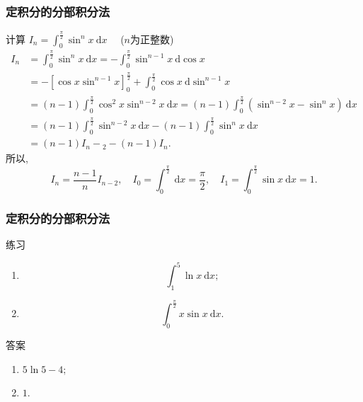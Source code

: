 \documentclass[
10pt,
aspectratio=43,
]{beamer}
\begin{document}
\begin{frame}
	\frametitle{定积分的分部积分法}
	\everymath{\displaystyle}
	{\small
		\begin{block}{计算 $I_n=\int_0^{\frac{\pi}{2}} \sin ^n x \mathrm{~d} x\quad$ ($n$为正整数) }
			$$
				\begin{aligned}
					I_n & =\int_0^{\frac{\pi}{2}} \sin ^n x \mathrm{~d} x=-\int_0^{\frac{\pi}{2}} \sin ^{n-1} x \mathrm{~d} \cos x                                           \\
					    & =-\left[\cos x \sin ^{n-1} x\right]_0^{\frac{\pi}{2}}+\int_0^{\frac{\pi}{2}} \cos x \mathrm{~d} \sin ^{n-1} x                                      \\
					    & =(n-1) \int_0^{\frac{\pi}{2}} \cos ^2 x \sin ^{n-2} x \mathrm{~d} x=(n-1) \int_0^{\frac{\pi}{2}}\left(\sin ^{n-2} x-\sin ^n x\right) \mathrm{~d} x \\
					    & =(n-1) \int_0^{\frac{\pi}{2}} \sin ^{n-2} x \mathrm{~d} x-(n-1) \int_0^{\frac{\pi}{2}} \sin ^n x \mathrm{~d} x                                     \\
					    & =(n-1) I_n-{ }_2-(n-1) I_n.
				\end{aligned}
			$$
			所以,
			$$
				I_n=\frac{n-1}{n} I_{n-2},\quad I_0=\int_0^{\frac{\pi}{2}} \mathrm{~d} x=\frac{\pi}{2}, \quad I_1=\int_0^{\frac{\pi}{2}} \sin x \mathrm{~d} x=1.
			$$
		\end{block}
	}
\end{frame}

\begin{frame}
	\frametitle{定积分的分部积分法}
	\everymath{\displaystyle}
	\begin{block}{练习}
		\begin{enumerate}
			\item
			      $$
				      \int_1^5 \ln x  \mathrm{~d} x;
			      $$
			\item
			      $$
				      \int_0^{\frac{\pi}{2}} x \sin x \mathrm{~d} x.
			      $$
		\end{enumerate}
	\end{block}
	\pause 
	\begin{exampleblock}{答案}
		\begin{enumerate}[<+->]
			\item $5\ln 5-4$;\vspace{0.5cm}
			\item $1$.
		\end{enumerate}
	\end{exampleblock}
\end{frame}
\end{document}
